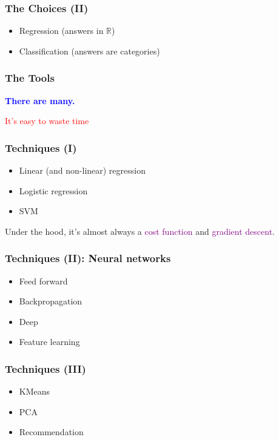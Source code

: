 \documentclass{beamer}
\newcommand\blue[1]{\textcolor{blue}{#1}}
\newcommand\red[1]{\textcolor{red}{#1}}
\newcommand\purple[1]{\textcolor{purple}{#1}}
\newcommand\phrase[1]{\centerline{\huge\bf\blue{#1}}}
\begin{document}
\begin{frame}
  \frametitle{The Choices (II)}
  \begin{itemize}
  \item Regression (answers in $\mathbb{R}$)
  \item Classification (answers are categories)
  \end{itemize}
\end{frame}

\begin{frame}
  \frametitle{The Tools}

  \phrase{There are many.}

  \vspace{1cm}
  \centerline{  \red{It's easy to waste time}}
\end{frame}

\begin{frame}
  \frametitle{Techniques (I)}

  \begin{itemize}
  \item Linear (and non-linear) regression
  \item Logistic regression
  \item SVM
  \end{itemize}

  Under the hood, it's almost always a \purple{cost function} and
  \purple{gradient descent}.
\end{frame}

\begin{frame}
  \frametitle{Techniques (II): Neural networks}

  \begin{itemize}
  \item Feed forward
  \item Backpropagation
  \item Deep
  \item Feature learning
  \end{itemize}
\end{frame}

\begin{frame}
  \frametitle{Techniques (III)}

  \begin{itemize}
  \item KMeans
  \item PCA
  \item Recommendation
  \end{itemize}
\end{frame}
\end{document}
